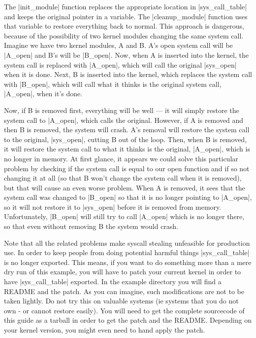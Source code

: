 \documentclass[10pt, oneside]{book}
\begin{document}
The \cpp|init_module| function replaces the appropriate location in \cpp|sys_call_table| and keeps the original pointer in a variable.
The \cpp|cleanup_module| function uses that variable to restore everything back to normal.
This approach is dangerous, because of the possibility of two kernel modules changing the same system call.
Imagine we have two kernel modules, A and B. A's open system call will be \cpp|A_open| and B's will be \cpp|B_open|.
Now, when A is inserted into the kernel, the system call is replaced with \cpp|A_open|, which will call the original \cpp|sys_open| when it is done.
Next, B is inserted into the kernel, which replaces the system call with \cpp|B_open|, which will call what it thinks is the original system call, \cpp|A_open|, when it's done.

Now, if B is removed first, everything will be well --- it will simply restore the system call to \cpp|A_open|, which calls the original.
However, if A is removed and then B is removed, the system will crash.
A's removal will restore the system call to the original, \cpp|sys_open|, cutting B out of the loop.
Then, when B is removed, it will restore the system call to what it thinks is the original, \cpp|A_open|, which is no longer in memory.
At first glance, it appears we could solve this particular problem by checking if the system call is equal to our open function and if so not changing it at all (so that B won't change the system call when it is removed), but that will cause an even worse problem.
When A is removed, it sees that the system call was changed to \cpp|B_open| so that it is no longer pointing to \cpp|A_open|, so it will not restore it to \cpp|sys_open| before it is removed from memory.
Unfortunately, \cpp|B_open| will still try to call \cpp|A_open| which is no longer there, so that even without removing B the system would crash.

Note that all the related problems make syscall stealing unfeasible for production use.
In order to keep people from doing potential harmful things \cpp|sys_call_table| is no longer exported.
This means, if you want to do something more than a mere dry run of this example, you will have to patch your current kernel in order to have \cpp|sys_call_table| exported.
In the example directory you will find a README and the patch.
As you can imagine, such modifications are not to be taken lightly.
Do not try this on valuable systems (ie systems that you do not own - or cannot restore easily).
You will need to get the complete sourcecode of this guide as a tarball in order to get the patch and the README.
Depending on your kernel version, you might even need to hand apply the patch.
\end{document}
